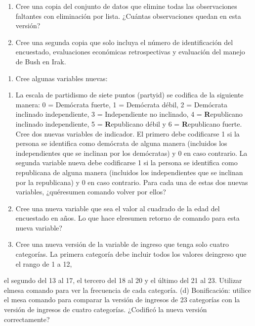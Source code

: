 \documentclass[
]{book}
\providecommand{\tightlist}{%
  \setlength{\itemsep}{0pt}\setlength{\parskip}{0pt}}
\begin{document}
\begin{enumerate}
\def\labelenumi{(\alph{enumi})}
\tightlist
\item
  Cree una copia del conjunto de datos que elimine todas las observaciones faltantes con eliminación por lista. ¿Cuántas observaciones quedan en esta versión?
\item
  Cree una segunda copia que solo incluya el número de identificación del encuestado,
  evaluaciones económicas retrospectivas y evaluación del manejo de Bush en Irak.
\end{enumerate}

\begin{enumerate}
\def\labelenumi{\arabic{enumi}.}
\setcounter{enumi}{3}
\tightlist
\item
  Cree algunas variables nuevas:
\end{enumerate}

\begin{enumerate}
\def\labelenumi{(\alph{enumi})}
\tightlist
\item
  La escala de partidismo de siete puntos (partyid) se codifica de la siguiente manera: 0 = Demócrata fuerte, 1 = Demócrata débil, 2 = Demócrata inclinado independiente, 3 = Independiente no inclinado, 4 = \textbf{R}epublicano inclinado independiente, 5 = \textbf{R}epublicano débil y 6 = \textbf{R}epublicano fuerte. Cree dos nuevas variables de indicador. El primero debe codificarse 1 si la persona se identifica como demócrata de alguna manera (incluidos los independientes que se inclinan por los demócratas) y 0 en caso contrario. La segunda variable nueva debe codificarse 1 si la persona se identifica como republicana de alguna manera (incluidos los independientes que se inclinan por la republicana) y 0 en caso contrario. Para cada una de estas dos nuevas variables, ¿quéresumen comando volver por ellos?
\item
  Cree una nueva variable que sea el valor al cuadrado de la edad del encuestado en años. Lo que hace elresumen retorno de comando para esta nueva variable?
\item
  Cree una nueva versión de la variable de ingreso que tenga solo cuatro categorías. La
  primera categoría debe incluir todos los valores deingreso que el rango de 1 a 12,
\end{enumerate}

el segundo del 13 al 17, el tercero del 18 al 20 y el último del 21 al 23. Utilizar elmesa comando para ver la frecuencia de cada categoría.
(d) Bonificación: utilice el mesa comando para comparar la versión de ingresos de 23 categorías con la versión de ingresos de cuatro categorías. ¿Codificó la nueva versión correctamente?
\end{document}
